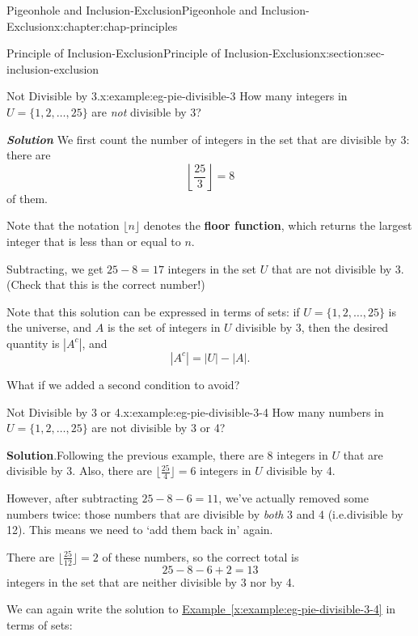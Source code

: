 \documentclass[oneside,10pt,]{book}
\newcommand{\blocktitlefont}{\relax}
\newcommand{\xreffont}{\relax}
\newcommand{\alert}[1]{\textbf{\textit{#1}}}
\newcommand{\terminology}[1]{\textbf{#1}}
\numberwithin{equation}{section}
\begin{document}
\begin{chapterptx}{Pigeonhole and Inclusion-Exclusion}{}{Pigeonhole and Inclusion-Exclusion}{}{}{x:chapter:chap-principles}
\begin{sectionptx}{Principle of Inclusion-Exclusion}{}{Principle of Inclusion-Exclusion}{}{}{x:section:sec-inclusion-exclusion}
\begin{example}{Not Divisible by 3.}{x:example:eg-pie-divisible-3}
How many integers in \(U = \{1,2,\ldots,25\}\) are \emph{not} divisible by 3?%
\par
\alert{Solution} \label{g:notation:id533630} We first count the number of integers in the set that are divisible by 3: there are%
\begin{equation*}
\left\lfloor \frac{25}{3}\right\rfloor = 8
\end{equation*}
of them.%
\par
Note that the notation \(\lfloor n \rfloor\) denotes the \terminology{floor function}, which returns the largest integer that is less than or equal to \(n\).%
\par
Subtracting, we get \(25 - 8 = 17\) integers in the set \(U\) that are not divisible by 3. (Check that this is the correct number!)%
\end{example}
Note that this solution can be expressed in terms of sets: if \(U = \{1,2,\ldots,25\}\) is the universe, and \(A\) is the set of integers in \(U\) divisible by 3, then the desired quantity is \(|A^c|\), and%
\begin{equation*}
|A^c| = |U| - |A|\text{.}
\end{equation*}
%
\par
What if we added a second condition to avoid?%
\begin{example}{Not Divisible by 3 or 4.}{x:example:eg-pie-divisible-3-4}%
How many numbers in \(U = \{1,2,\ldots,25\}\) are not divisible by 3 or 4?%
\par\smallskip%
\noindent\textbf{\blocktitlefont Solution}.\hypertarget{g:solution:id533692}{}\quad{}Following the previous example, there are \(8\) integers in \(U\) that are divisible by 3. Also, there are \(\lfloor \frac{25}{4} \rfloor = 6\) integers in \(U\) divisible by 4.%
\par
However, after subtracting \(25 - 8 - 6 = 11\), we've actually removed some numbers twice: those numbers that are divisible by \emph{both} 3 and 4 (i.e.\@ divisible by 12). This means we need to `add them back in' again.%
\par
There are \(\lfloor \frac{25}{12} \rfloor = 2\) of these numbers, so the correct total is%
\begin{equation*}
25 - 8 - 6 + 2 = 13
\end{equation*}
integers in the set that are neither divisible by 3 nor by 4.%
\end{example}
We can again write the solution to \hyperref[x:example:eg-pie-divisible-3-4]{Example~{\xreffont\ref{x:example:eg-pie-divisible-3-4}}} in terms of sets:%

\end{sectionptx}
\end{chapterptx}
\end{document}
